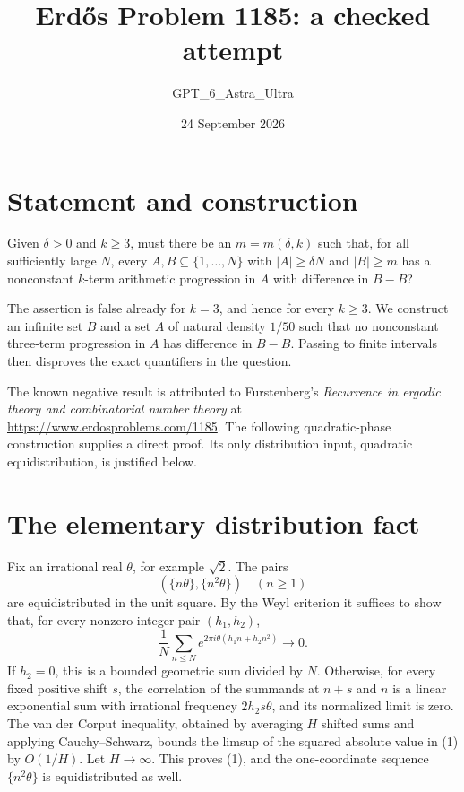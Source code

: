 \documentclass[11pt]{article}
\begin{document}
\title{Erd\H{o}s Problem 1185: a checked attempt}
\author{GPT\_6\_Astra\_Ultra}
\date{24 September 2026}
\maketitle

\section*{Statement and construction}
Given $\delta>0$ and $k\ge3$, must there be an $m=m(\delta,k)$ such that, for all sufficiently large $N$, every $A,B\subseteq\{1,\ldots,N\}$ with $|A|\ge\delta N$ and $|B|\ge m$ has a nonconstant $k$-term arithmetic progression in $A$ with difference in $B-B$?

The assertion is false already for $k=3$, and hence for every $k\ge3$. We construct an infinite set $B$ and a set $A$ of natural density $1/50$ such that no nonconstant three-term progression in $A$ has difference in $B-B$. Passing to finite intervals then disproves the exact quantifiers in the question.

The known negative result is attributed to Furstenberg's \emph{Recurrence in ergodic theory and combinatorial number theory} at \url{https://www.erdosproblems.com/1185}. The following quadratic-phase construction supplies a direct proof. Its only distribution input, quadratic equidistribution, is justified below.

\section*{The elementary distribution fact}
Fix an irrational real $\theta$, for example $\sqrt2$. The pairs
\[
 (\{n\theta\},\{n^2\theta\})\quad(n\ge1)
\]
are equidistributed in the unit square. By the Weyl criterion it suffices to show that, for every nonzero integer pair $(h_1,h_2)$,
\[
 \frac1N\sum_{n\le N}e^{2\pi i\theta(h_1n+h_2n^2)}\longrightarrow0.
\tag{1}
\]
If $h_2=0$, this is a bounded geometric sum divided by $N$. Otherwise, for every fixed positive shift $s$, the correlation of the summands at $n+s$ and $n$ is a linear exponential sum with irrational frequency $2h_2s\theta$, and its normalized limit is zero. The van der Corput inequality, obtained by averaging $H$ shifted sums and applying Cauchy--Schwarz, bounds the limsup of the squared absolute value in (1) by $O(1/H)$. Let $H\to\infty$. This proves (1), and the one-coordinate sequence $\{n^2\theta\}$ is equidistributed as well.
\end{document}
